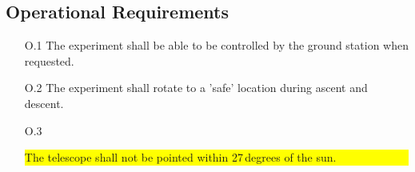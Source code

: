 \subsection{Operational Requirements}

\begin{enumerate}[topsep=0pt,itemsep=-1ex,partopsep=1ex,parsep=1ex]
    \item[O.1] The experiment shall be able to be controlled by the ground station when requested.
    \item[O.2] The experiment shall rotate to a 'safe' location during ascent and descent.
    \item[O.3] \colorbox{yellow}{\parbox{\textwidth}{The telescope shall not be pointed within 27\,degrees of the sun.}}
\end{enumerate}